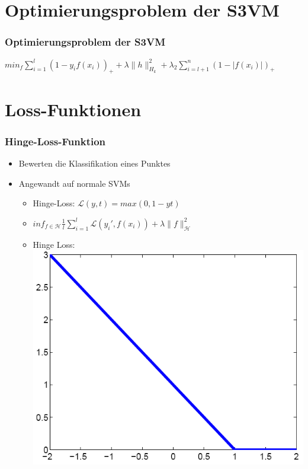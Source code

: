 \documentclass{beamer}
\begin{document}
\section{Optimierungsproblem der S3VM}

\begin{frame}
\frametitle{Optimierungsproblem der S3VM}
    $min_f \sum_{i=1}^l (1-y_i f(x_i))_+ + \lambda \|h\|^2_{H_k} + \lambda_2 \sum_{i=l+1}^n (1- |f(x_i)|)_+$
\end{frame}



\section{Loss-Funktionen}

\begin{frame}
\frametitle{Hinge-Loss-Funktion}
    \begin{itemize}
        \item Bewerten die Klassifikation eines Punktes
        \item Angewandt auf normale SVMs
        \begin{itemize}
            \item Hinge-Loss: $\mathcal{L}(y, t) = max(0, 1 − yt)$
            \item $inf_{f \in \mathcal{H}} \frac{1}{l} \sum_{i=1}^l \mathcal{L} (y_i', f(x_i)) + \lambda \|f\|^2_\mathcal{H}$
            \item Hinge Loss: \includegraphics[scale=0.2]{img/hinge_loss_function.png}
        \end{itemize}	
    \end{itemize}
\end{frame}
\end{document}
